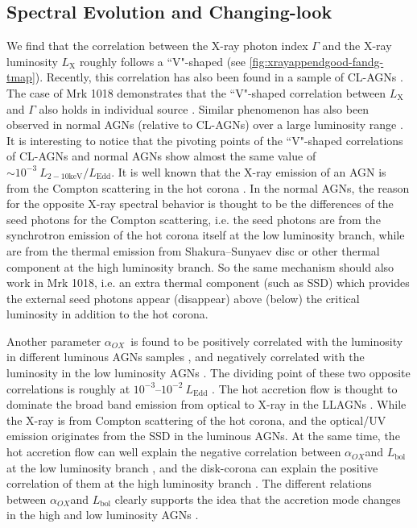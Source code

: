 \documentclass[twocolumn]{aastex63}
\newcommand{\alphaox}{$\alpha_{OX}$}
\begin{document}
\subsection{Spectral Evolution and Changing-look}
\label{sec:spectral evolution}
We find that the correlation between the X-ray photon index $\Gamma$ and the X-ray luminosity $L_\mathrm{X}$ roughly follows a ``V"-shaped (see \autoref{fig:xrayappendgood-fandg-tmap}). Recently, this correlation has also been found in a sample of CL-AGNs \citep[e.g.][]{2019arXiv191203972L}. The case of Mrk 1018 demonstrates that the ``V"-shaped correlation between $L_\mathrm{X}$ and $\Gamma$ also holds in individual source \citep[see also in ][etc]{2020ApJ...890L..29A}. Similar phenomenon has also been observed in normal AGNs (relative to CL-AGNs) over a large luminosity range \citep[e.g. ][]{2009MNRAS.399..349G, 2011A&A...530A.149Y}. It is interesting to notice that the pivoting points of the ``V"-shaped correlations of CL-AGNs and normal AGNs show almost the same value of  $\sim 10^{-3}~L_\mathrm{2-10 keV}/L_\mathrm{Edd}$. It is well known that the X-ray emission of an AGN is from the Compton scattering in the hot corona \citep[e.g.][]{1991ApJ...380L..51H}. In the normal AGNs, the reason for the opposite X-ray spectral behavior is thought to be the differences of the seed photons for the Compton scattering, i.e. the seed photons are from the synchrotron emission of the hot corona itself at the low luminosity branch, while are from the thermal emission from Shakura–Sunyaev disc \citep[SSD; e.g. ][]{2013ApJ...764....2Q} or other thermal component \citep{2015MNRAS.447.1692Y} at the high luminosity branch. So the same mechanism should also work in Mrk 1018, i.e. an extra thermal component (such as SSD) which provides the external seed photons appear (disappear) above (below) the critical luminosity in addition to the hot corona. 

Another parameter \alphaox\, is found to be positively correlated with the luminosity in different luminous AGNs samples \citep[e.g.][]{2010A&A...512A..34L, 2013A&A...550A..71V,2016ApJ...819..154L}, and negatively correlated with the luminosity in the low luminosity AGNs \citep{2011ApJ...739...64X,2017MNRAS.471.2848L}. The dividing point of these two opposite correlations is roughly at $10^{-3}$--$10^{-2}~L_\mathrm{Edd}$ \citep{2011ApJ...739...64X,2017MNRAS.471.2848L}. The hot accretion flow is thought to dominate the broad band emission from optical to X-ray in the LLAGNs \citep[see reviews in ][]{2014ARA&A..52..529Y}. While the X-ray is from Compton scattering of the hot corona, and the optical/UV emission originates from the SSD in the luminous AGNs. At the same time, the hot accretion flow can well explain the negative correlation between \alphaox and $L_\mathrm{bol}$ at the low luminosity branch \citep{2011ApJ...739...64X,2017MNRAS.471.2848L}, and the disk-corona can explain the positive correlation of them at the high luminosity branch \citep{2017A&A...602A..79L, 2018MNRAS.480.1247K,2019A&A...628A.135A}. The different relations between \alphaox and $L_\mathrm{bol}$ clearly supports the idea that the accretion mode changes in the high and low luminosity AGNs \citep{2011MNRAS.413.2259S,2019ApJ...883...76R}. 
\end{document}
